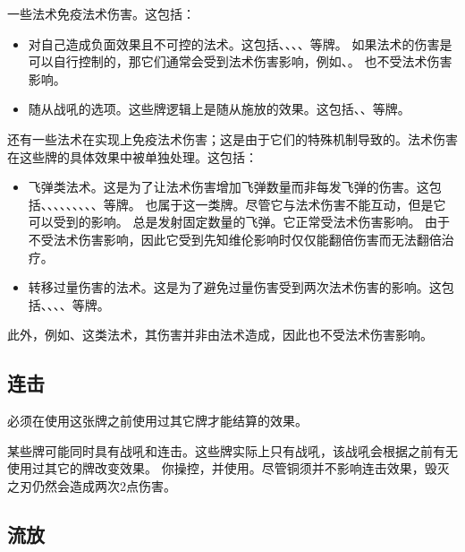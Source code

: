 一些法术免疫法术伤害。这包括：
\begin{itemize}
    \item 对自己造成负面效果且不可控的法术。这包括、、、、等牌。
        \notice 如果法术的伤害是可以自行控制的，那它们通常会受到法术伤害影响，例如、。
        \exception {}也不受法术伤害影响。
    \item 随从战吼的选项。这些牌逻辑上是随从施放的效果。这包括、、等牌。
\end{itemize}

还有一些法术在实现上免疫法术伤害；这是由于它们的特殊机制导致的。法术伤害在这些牌的具体效果中被单独处理。这包括：
\begin{itemize}
    \item 飞弹类法术。这是为了让法术伤害增加飞弹数量而非每发飞弹的伤害。这包括、、、、、、、、、等牌。
        \notice {}也属于这一类牌。尽管它与法术伤害不能互动，但是它可以受到的影响。
        \exception {}总是发射固定数量的飞弹。它正常受法术伤害影响。
        \notice 由于不受法术伤害影响，因此它受到先知维伦影响时仅仅能翻倍伤害而无法翻倍治疗。
    \item 转移过量伤害的法术。这是为了避免过量伤害受到两次法术伤害的影响。这包括、、、、等牌。
\end{itemize}

此外，例如、这类法术，其伤害并非由法术造成，因此也不受法术伤害影响。

\subsection{连击}
\label{combo}

必须在使用这张牌之前使用过其它牌才能结算的效果。

某些牌可能同时具有战吼和连击。这些牌实际上只有战吼，该战吼会根据之前有无使用过其它的牌改变效果。
\example 你操控，并使用。尽管铜须并不影响连击效果，毁灭之刃仍然会造成两次2点伤害。

\subsection{流放}
\label{outcast}

